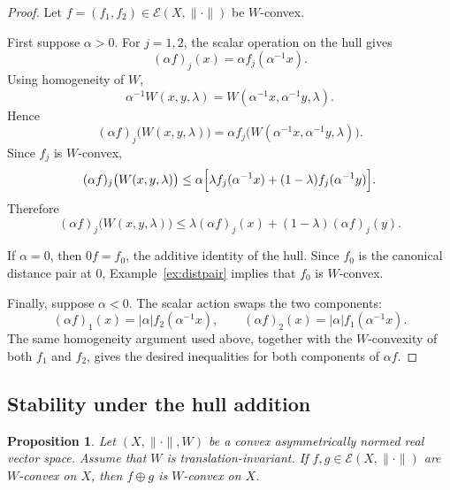 \documentclass[preprint,12pt]{elsarticle}
\numberwithin{equation}{section}
\newtheorem{proposition}[theorem]{Proposition}
\newcommand{\E}{\mathcal{E}}
\begin{document}
\begin{proof}
Let \(f=(f_1,f_2)\in\E(X,\|\cdot\|)\) be \(W\)-convex.

First suppose \(\alpha>0\).  For \(j=1,2\), the scalar operation on the hull
gives
\[
(\alpha f)_j(x)=\alpha f_j(\alpha^{-1}x).
\]
Using homogeneity of \(W\),
\[
\alpha^{-1}W(x,y,\lambda)
=
W(\alpha^{-1}x,\alpha^{-1}y,\lambda).
\]
Hence
\[
(\alpha f)_j\bigl(W(x,y,\lambda)\bigr)
=
\alpha f_j\bigl(W(\alpha^{-1}x,\alpha^{-1}y,\lambda)\bigr).
\]
Since \(f_j\) is \(W\)-convex,
\[
(\alpha f)_j\bigl(W(x,y,\lambda)\bigr)
\le
\alpha\Bigl[
\lambda f_j(\alpha^{-1}x)
+
(1-\lambda)f_j(\alpha^{-1}y)
\Bigr].
\]
Therefore
\[
(\alpha f)_j\bigl(W(x,y,\lambda)\bigr)
\le
\lambda(\alpha f)_j(x)+(1-\lambda)(\alpha f)_j(y).
\]

If \(\alpha=0\), then \(0f=f_0\), the additive identity of the hull.  Since
\(f_0\) is the canonical distance pair at \(0\), Example~\ref{ex:distpair}
implies that \(f_0\) is \(W\)-convex.

Finally, suppose \(\alpha<0\).  The scalar action swaps the two components:
\[
(\alpha f)_1(x)=|\alpha|f_2(\alpha^{-1}x),
\qquad
(\alpha f)_2(x)=|\alpha|f_1(\alpha^{-1}x).
\]
The same homogeneity argument used above, together with the \(W\)-convexity of
both \(f_1\) and \(f_2\), gives the desired inequalities for both components
of \(\alpha f\).
\end{proof}

\subsection{Stability under the hull addition}

\begin{proposition}\label{prop:oplusWconvex}
Let \((X,\|\cdot\|,W)\) be a convex asymmetrically normed real vector space.
Assume that \(W\) is translation-invariant.  If
\(f,g\in\E(X,\|\cdot\|)\) are \(W\)-convex on \(X\), then
\(f\oplus g\) is \(W\)-convex on \(X\).
\end{proposition}
\end{document}

